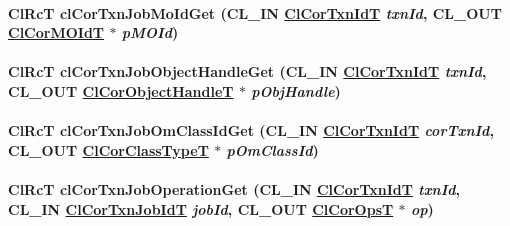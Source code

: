 \hypertarget{group__group13_ga76}{
\paragraph[clCorTxnJobMoIdGet]{\setlength{\rightskip}{0pt plus 5cm}Cl\-Rc\-T cl\-Cor\-Txn\-Job\-Mo\-Id\-Get (CL\_\-IN \hyperlink{group__group13_ga17}{Cl\-Cor\-Txn\-Id\-T} {\em txn\-Id}, CL\_\-OUT \hyperlink{struct_cl_cor_m_o_id}{Cl\-Cor\-MOId\-T} $\ast$ {\em p\-MOId})}\hfill}
\label{group__group13_ga76}


\hypertarget{group__group13_ga77}{
\paragraph[clCorTxnJobObjectHandleGet]{\setlength{\rightskip}{0pt plus 5cm}Cl\-Rc\-T cl\-Cor\-Txn\-Job\-Object\-Handle\-Get (CL\_\-IN \hyperlink{group__group13_ga17}{Cl\-Cor\-Txn\-Id\-T} {\em txn\-Id}, CL\_\-OUT \hyperlink{struct_cl_cor_object_handle}{Cl\-Cor\-Object\-Handle\-T} $\ast$ {\em p\-Obj\-Handle})}\hfill}
\label{group__group13_ga77}


\hypertarget{group__group13_ga86}{
\paragraph[clCorTxnJobOmClassIdGet]{\setlength{\rightskip}{0pt plus 5cm}Cl\-Rc\-T cl\-Cor\-Txn\-Job\-Om\-Class\-Id\-Get (CL\_\-IN \hyperlink{group__group13_ga17}{Cl\-Cor\-Txn\-Id\-T} {\em cor\-Txn\-Id}, CL\_\-OUT \hyperlink{group__group13_ga2}{Cl\-Cor\-Class\-Type\-T} $\ast$ {\em p\-Om\-Class\-Id})}\hfill}
\label{group__group13_ga86}


\hypertarget{group__group13_ga75}{
\paragraph[clCorTxnJobOperationGet]{\setlength{\rightskip}{0pt plus 5cm}Cl\-Rc\-T cl\-Cor\-Txn\-Job\-Operation\-Get (CL\_\-IN \hyperlink{group__group13_ga17}{Cl\-Cor\-Txn\-Id\-T} {\em txn\-Id}, CL\_\-IN \hyperlink{group__group13_ga18}{Cl\-Cor\-Txn\-Job\-Id\-T} {\em job\-Id}, CL\_\-OUT \hyperlink{group__group13_ga333}{Cl\-Cor\-Ops\-T} $\ast$ {\em op})}\hfill}
\label{group__group13_ga75}


